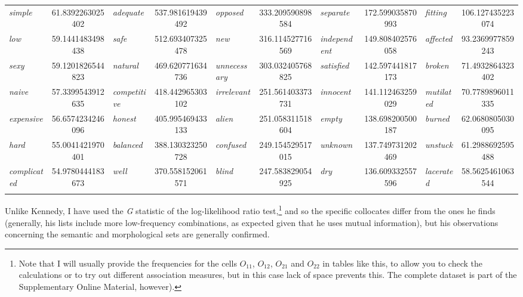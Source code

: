 \begin{sidewaystable}
\begin{tabular}{*{5}{lS[table-format=3.2,table-figures-decimal=2]}}
\textit{simple} & 61.8392263025402 & \textit{adequate} & 537.981619439492 & \textit{opposed} & 333.209590898584 & \textit{separate} & 172.599035870993 & \textit{fitting} & 106.127435223074 \\
\textit{low} & 59.1441483498438 & \textit{safe} & 512.693407325478 & \textit{new} & 316.114527716569 & \textit{independent} & 149.808402576058 & \textit{affected} & 93.2369977859243 \\
\textit{sexy} & 59.1201826544823 & \textit{natural} & 469.620771634736 & \textit{unnecessary} & 303.032405768825 & \textit{satisfied} & 142.597441817173 & \textit{broken} & 71.4932864323402 \\
\textit{naive} & 57.3399543912635 & \textit{competitive} & 418.442965303102 & \textit{irrelevant} & 251.561403373731 & \textit{innocent} & 141.112463259029 & \textit{mutilated} & 70.7789896011335 \\
\textit{expensive} & 56.6574234246096 & \textit{honest} & 405.995469433133 & \textit{alien} & 251.058311518604 & \textit{empty} & 138.698200500187 & \textit{burned} & 62.0680805030095 \\
\textit{hard} & 55.0041421970401 & \textit{balanced} & 388.130323250728 & \textit{confused} & 249.154529517015 & \textit{unknown} & 137.749731202469 & \textit{unstuck} & 61.2988692595488 \\
\textit{complicated} & 54.9780444183673 & \textit{well} & 370.558152061571 & \textit{blind} & 247.583829054925 & \textit{dry} & 136.609332557596 & \textit{lacerated} & 58.5625461063544 \\
\lspbottomrule
{} \\ %
\end{tabular}
\end{sidewaystable}

Unlike Kennedy, I have used the \emph{G} statistic  of the log\hyp{}likelihood  ratio test,\footnote{Note that I will usually provide the frequencies for the cells $O_{11}$, $O_{12}$, $O_{21}$ and $O_{22}$ in tables like this, to allow you to check the calculations or to try out different association  measures,  but in this case lack of space prevents this. The complete dataset is part of the Supplementary Online Material, however).} and so the specific collocates differ from the ones he finds (generally, his lists include more low\hyp{}frequency  combinations, as expected given that he uses mutual information),  but his observations concerning the semantic  and morphological  sets are generally confirmed.


